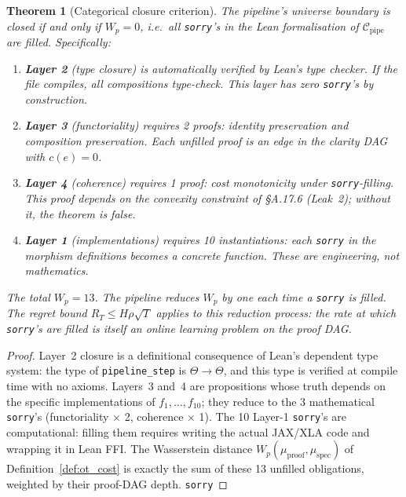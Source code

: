 \documentclass[11pt,a4paper]{article}
\newtheorem{theorem}{Theorem}[section]
\theoremstyle{definition}
\theoremstyle{remark}
\begin{document}
\begin{theorem}[Categorical closure criterion]\label{thm:closure}
The pipeline's universe boundary is closed if and only if $W_p = 0$, i.e.\ all \texttt{sorry}'s in the Lean formalisation of $\mathcal{C}_{\mathrm{pipe}}$ are filled. Specifically:
\begin{enumerate}[nosep]
\item[(i)] \textbf{Layer 2} (type closure) is \emph{automatically verified} by Lean's type checker. If the file compiles, all compositions type-check. This layer has zero \texttt{sorry}'s by construction.
\item[(ii)] \textbf{Layer 3} (functoriality) requires 2 proofs: identity preservation and composition preservation. Each unfilled proof is an edge in the clarity DAG with $c(e) = 0$.
\item[(iii)] \textbf{Layer 4} (coherence) requires 1 proof: cost monotonicity under \texttt{sorry}-filling. This proof depends on the convexity constraint of \S A.17.6 (Leak~2); without it, the theorem is false.
\item[(iv)] \textbf{Layer 1} (implementations) requires 10 instantiations: each \texttt{sorry} in the morphism definitions becomes a concrete function. These are engineering, not mathematics.
\end{enumerate}
The total $W_p = 13$. The pipeline reduces $W_p$ by one each time a \texttt{sorry} is filled. The regret bound $R_T \leq H\rho\sqrt{T}$ applies to this reduction process: the rate at which \texttt{sorry}'s are filled is itself an online learning problem on the proof DAG.
\end{theorem}

\begin{proof}
Layer~2 closure is a definitional consequence of Lean's dependent type system: the type of \texttt{pipeline\_step} is $\Theta \to \Theta$, and this type is verified at compile time with no axioms. Layers~3 and~4 are propositions whose truth depends on the specific implementations of $f_1, \ldots, f_{10}$; they reduce to the 3 mathematical \texttt{sorry}'s (functoriality $\times$ 2, coherence $\times$ 1). The 10 Layer-1 \texttt{sorry}'s are computational: filling them requires writing the actual JAX/XLA code and wrapping it in Lean FFI. The Wasserstein distance $W_p(\mu_{\mathrm{proof}}, \mu_{\mathrm{spec}})$ of Definition~\ref{def:ot_cost} is exactly the sum of these 13 unfilled obligations, weighted by their proof-DAG depth. \texttt{sorry}
\end{proof}
\end{document}

